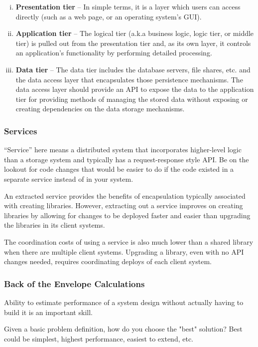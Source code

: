 \documentclass{article}
\begin{document}
    \begin{enumerate}[i.]
        \item \textbf{Presentation tier} -- In simple terms, it is a layer which users can access directly (such as a web page, or an operating system's GUI).
        \item \textbf{Application tier} -- The logical tier (a.k.a business logic, logic tier, or middle tier) is pulled out from the presentation tier and, as its own layer, it controls an application’s functionality by performing detailed processing.
        \item \textbf{Data tier} -- The data tier includes the database servers, file shares, etc. and the data access layer that encapsulates those persistence mechanisms. The data access layer should provide an API to expose the data to the application tier for providing methods of managing the stored data without exposing or creating dependencies on the data storage mechanisms.
    \end{enumerate}
    
    \subsubsection{Services}
    ``Service” here means a distributed system that incorporates higher-level logic than a storage system and typically has a request-response style API. Be on the lookout for code changes that would be easier to do if the code existed in a separate service instead of in your system.
    
    An extracted service provides the benefits of encapsulation typically associated with creating libraries. However, extracting out a service improves on creating libraries by allowing for changes to be deployed faster and easier than upgrading the libraries in its client systems.
    
    The coordination costs of using a service is also much lower than a shared library when there are multiple client systems. Upgrading a library, even with no API changes needed, requires coordinating deploys of each client system.

    \subsubsection{Back of the Envelope Calculations}
    Ability to estimate performance of a system design without actually having to build it is an important skill.
    
    Given a basic problem definition, how do you choose the "best" solution? Best could be simplest, highest performance, easiest to extend, etc.
    
\end{document}
